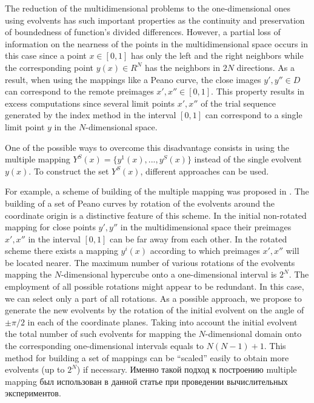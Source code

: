 \documentclass[smallextended]{svjour3}       %
\begin{document}
The reduction of the multidimensional problems to the one-dimensional ones using evolvents has such important properties as the continuity and preservation of boundedness of function's divided differences. However, a partial loss of information on the nearness of the points in the multidimensional space occurs in this case since a point $x \in [0,1]$ has only the left and the right neighbors while the corresponding point $y(x) \in R^N$ has the neighbors in $2N$ directions. As a result, when using the mappings like a Peano curve, the close images $y', y'' \in D$ can correspond to the remote preimages $x', x'' \in [0,1]$. This property results in excess computations since several limit points $x', x''$ of the trial sequence generated by the index method in the interval $[0,1]$ can correspond to a single limit point $y$ in the $N$-dimensional space.

One of the possible ways to overcome this disadvantage consists in using the multiple mapping $Y^S(x)=\{ y^1 (x),...,y^S(x)\}$ instead of the single evolvent $y(x)$. To construct the set $Y^S(x)$, different approaches can be used. 

For example, a scheme of building of the multiple mapping was proposed  in \cite{6_Gergel2009}. The building of a set of Peano curves by rotation of the evolvents around the coordinate origin is a distinctive feature of this scheme. In the initial non-rotated mapping for close points $y', y''$ in the multidimensional space their preimages  $x', x''$ in the interval $[0,1]$ can be far away from each other. In the rotated scheme there exists a mapping $y^i(x)$ according to which preimages $x', x''$ will be located nearer. The maximum number of various rotations of the evolvents mapping the $N$-dimensional hypercube onto a one-dimensional interval is $2^N$. The employment of all possible rotations might appear to be redundant. In this case, we can select only a part of all rotations. As a possible approach, we propose to generate the new evolvents by the rotation of the initial evolvent on the angle of $\pm\pi/2$ in each of the coordinate planes. Taking into account the initial evolvent the total number of such evolvents for mapping the $N$-dimensional domain onto the corresponding one-dimensional intervals equals to $N(N-1)+1$. This method for building a set of mappings can be ``scaled'' easily to obtain more evolvents (up to $2^N$) if necessary.
\Russian
Именно такой подход к построению multiple mapping был использован в данной статье при проведении вычислительных экспериментов. 
\end{document}
